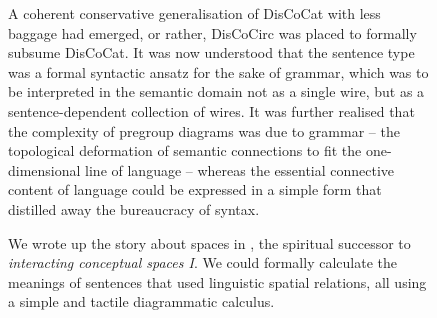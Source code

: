 \begin{figure}[h!]
\centering
{}
\caption{A coherent conservative generalisation of DisCoCat with less baggage had emerged, or rather, DisCoCirc was placed to formally subsume DisCoCat. It was now understood that the sentence type was a formal syntactic ansatz for the sake of grammar, which was to be interpreted in the semantic domain not as a single wire, but as a sentence-dependent collection of wires. It was further realised that the complexity of pregroup diagrams was due to grammar -- the topological deformation of semantic connections to fit the one-dimensional line of language -- whereas the essential connective content of language could be expressed in a simple form that distilled away the bureaucracy of syntax.}
\end{figure}

\begin{figure}[h!]
\centering
{}
\caption{We wrote up the story about spaces in \citep{wang-mascianica_talking_2021}, the spiritual successor to \emph{interacting conceptual spaces I}. We could formally calculate the meanings of sentences that used linguistic spatial relations, all using a simple and tactile diagrammatic calculus.}
\end{figure}

